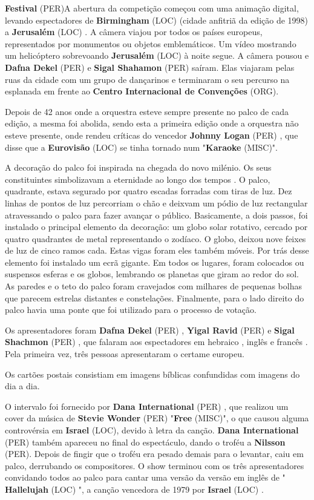 \documentclass[12pt,a4paper]{article}
\begin{document}
\textbf{Festival} (PER)A abertura da competição começou com uma animação digital, levando espectadores de \textbf{Birmingham} (LOC) (cidade anfitriã da edição de 1998) a \textbf{Jerusalém} (LOC) . A câmera viajou por todos os países europeus, representados por monumentos ou objetos emblemáticos. Um vídeo mostrando um helicóptero sobrevoando \textbf{Jerusalém} (LOC) à noite segue. A câmera pousou e \textbf{Dafna Dekel} (PER) e \textbf{Sigal Shahamon} (PER) saíram. Elas viajaram pelas ruas da cidade com um grupo de dançarinos e terminaram o seu percurso na esplanada em frente ao \textbf{Centro Internacional de Convenções} (ORG).

Depois de 42 anos onde a orquestra esteve sempre presente no palco de cada edição, a mesma foi abolida, sendo esta a primeira edição onde a orquestra não esteve presente, onde rendeu críticas do vencedor \textbf{Johnny Logan} (PER) , que disse que a \textbf{Eurovisão} (LOC) se tinha tornado num "\textbf{Karaoke} (MISC)".

A decoração do palco foi inspirada na chegada do novo milénio. Os seus constituintes simbolizavam a eternidade ao longo dos tempos . O palco, quadrante, estava segurado por quatro escadas forradas com tiras de luz. Dez linhas de pontos de luz percorriam o chão e deixvam um pódio de luz rectangular atravessando o palco para fazer avançar o público. Basicamente, a dois passos, foi instalado o principal elemento da decoração: um globo solar rotativo, cercado por quatro quadrantes de metal representando o zodíaco. O globo, deixou nove feixes de luz de cinco ramos cada. Estas vigas foram eles também móveis. Por trás desse elemento foi instalado um ecrã gigante. Em todos os lugares, foram colocados ou suspensos esferas e os globos, lembrando os planetas que giram ao redor do sol. As paredes e o teto do palco foram cravejados com milhares de pequenas bolhas que parecem estrelas distantes e constelações. Finalmente, para o lado direito do palco havia uma ponte que foi utilizado para o processo de votação.

Os apresentadores foram \textbf{Dafna Dekel} (PER) , \textbf{Yigal Ravid} (PER) e \textbf{Sigal Shachmon} (PER) , que falaram aos espectadores em hebraico , inglês e francês . Pela primeira vez, três pessoas apresentaram o certame europeu.

Os cartões postais consistiam em imagens bíblicas confundidas com imagens do dia a dia.

O intervalo foi fornecido por \textbf{Dana International} (PER) , que realizou um cover da música de \textbf{Stevie Wonder} (PER) "\textbf{Free} (MISC)", o que causou alguma controvérsia em \textbf{Israel} (LOC), devido à letra da canção. \textbf{Dana International} (PER) também apareceu no final do espectáculo, dando o troféu a \textbf{Nilsson} (PER). Depois de fingir que o troféu era pesado demais para o levantar, caiu em palco, derrubando os compositores. O show terminou com os três apresentadores convidando todos ao palco para cantar uma versão da versão em inglês de " \textbf{Hallelujah} (LOC) ", a canção vencedora de 1979 por \textbf{Israel} (LOC) .
\end{document}
